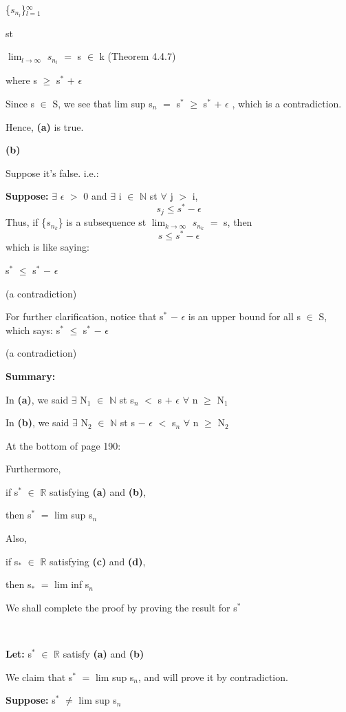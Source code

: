 \documentclass{article}
\newcommand{\mt}[1]{\ensuremath{#1}}
\newcommand{\lt}[1]{\textbf{Let: } #1}
\newcommand{\supp}[1]{\textbf{Suppose: } #1}
\newcommand{\bpth}[1]{\textbf{(#1)}}
\newcommand{\dbs}[3]{\mt{#1_{#2_#3}}}
\newcommand{\br}{\mt{\mathbb{R}} }       %
\newcommand{\bn}{\mt{\mathbb{N}} }       %
\newcommand{\ep}{\mt{\epsilon} }         %
\newcommand{\fa}{\mt{\forall} }          %
\newcommand{\mem}{\mt{\in} }
\newcommand{\exs}{\mt{\exists} }
\newcommand{\bk}[1]{\{#1\}}
\newcommand{\ps}{\mt{+} }
\newcommand{\ms}{\mt{-} }
\newcommand{\ls}{\mt{<} }
\newcommand{\gr}{\mt{>} }
\newcommand{\lse}{\mt{\leq} }
\newcommand{\gre}{\mt{\geq} }
\newcommand{\eql}{\mt{=} }
\newcommand{\uw}[2]{#1\mt{_{#2}}}
\newcommand{\uf}[2]{#1\mt{^{#2}}}
\newcommand{\lmti}[1]{\mt{\displaystyle{\lim_{#1 \to \infty}}}}
\newcommand{\eqn}[1]{\[#1\]}
\begin{document}
{\bk{\dbs{s}{n}{l}}$^\infty_{l = 1}$

st

\lmti{l} \dbs{s}{n}{l} \eql s \mem k (Theorem 4.4.7)

where s \gre \uf{s}{*} \ps \ep

Since s \mem S, we see that lim sup \uw{s}{n} \eql \uf{s}{*} \gre \uf{s}{*} \ps \ep, which is a contradiction.

Hence, \bpth{a} is true.

\bpth{b}

Suppose it's false. i.e.:

\supp{\exs \ep \gr 0 and \exs i \mem \bn st \fa j \gr i,}
\eqn{s_j \lse s^* - \epsilon}
Thus, if \bk{\dbs{s}{n}{k}} is a subsequence st \lmti{k} \dbs{s}{n}{k} \eql s, then
\eqn{s \lse s^* - \epsilon}
which is like saying:

\uf{s}{*} \lse \uf{s}{*} \ms \ep

(a contradiction)

For further clarification, notice that \uf{s}{*} \ms \ep is an upper bound for all s \mem S, which says: \uf{s}{*} \lse \uf{s}{*} \ms \ep

(a contradiction)

\textbf{Summary:}

In \bpth{a}, we said \exs \uw{N}{1} \mem \bn st \uw{s}{n} \ls s \ps \ep \fa n \gre \uw{N}{1}

In \bpth{b}, we said \exs \uw{N}{2} \mem \bn st s \ms \ep \ls \uw{s}{n} \fa n \gre \uw{N}{2}

\newpage

At the bottom of page 190:

Furthermore, 

if \uf{s}{*} \mem \br satisfying \bpth{a} and \bpth{b}, 

then \uf{s}{*} \eql lim sup \uw{s}{n}

Also,

if \uw{s}{*} \mem \br satisfying \bpth{c} and \bpth{d},

then \uw{s}{*} \eql lim inf \uw{s}{n}

We shall complete the proof by proving the result for \uf{s}{*}

\

\lt{\uf{s}{*} \mem \br satisfy \bpth{a} and \bpth{b}}

We claim that \uf{s}{*} \eql lim sup \uw{s}{n}, and will prove it by contradiction.

\supp{\uf{s}{*} $\neq$ lim sup \uw{s}{n}}

}
\end{document}
